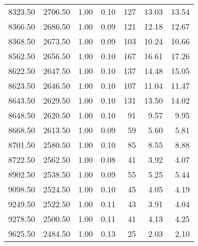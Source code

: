 \begin{table}
\begin{tabular}{rrrrrrr}
8323.50 & 2706.50 & 1.00 & 0.10 & 127 & 13.03 & 13.54 \\
8366.50 & 2686.50 & 1.00 & 0.09 & 121 & 12.18 & 12.67 \\
8368.50 & 2673.50 & 1.00 & 0.09 & 103 & 10.24 & 10.66 \\
8562.50 & 2656.50 & 1.00 & 0.10 & 167 & 16.61 & 17.26 \\
8622.50 & 2647.50 & 1.00 & 0.10 & 137 & 14.48 & 15.05 \\
8623.50 & 2646.50 & 1.00 & 0.10 & 107 & 11.04 & 11.47 \\
8643.50 & 2629.50 & 1.00 & 0.10 & 131 & 13.50 & 14.02 \\
8648.50 & 2620.50 & 1.00 & 0.10 & 91 & 9.57 & 9.95 \\
8668.50 & 2613.50 & 1.00 & 0.09 & 59 & 5.60 & 5.81 \\
8701.50 & 2580.50 & 1.00 & 0.10 & 85 & 8.55 & 8.88 \\
8722.50 & 2562.50 & 1.00 & 0.08 & 41 & 3.92 & 4.07 \\
8902.50 & 2538.50 & 1.00 & 0.09 & 55 & 5.25 & 5.44 \\
9098.50 & 2524.50 & 1.00 & 0.10 & 45 & 4.05 & 4.19 \\
9249.50 & 2522.50 & 1.00 & 0.11 & 43 & 3.91 & 4.04 \\
9278.50 & 2500.50 & 1.00 & 0.11 & 41 & 4.13 & 4.25 \\
9625.50 & 2484.50 & 1.00 & 0.13 & 25 & 2.03 & 2.10 \\
\bottomrule
\end{tabular}
\end{table}
